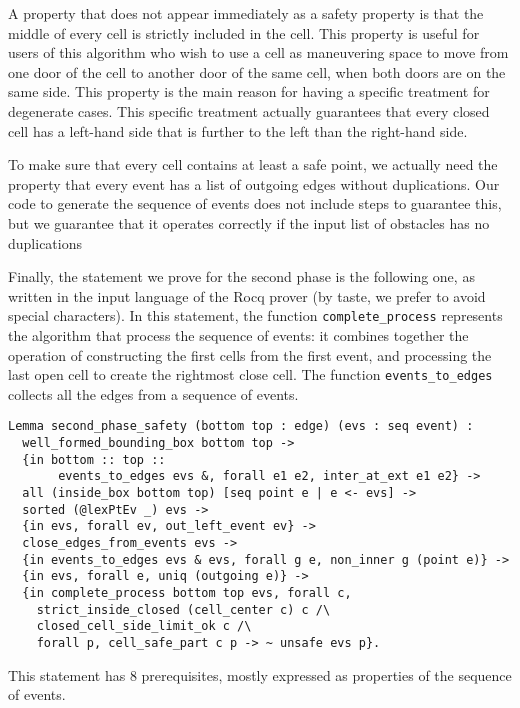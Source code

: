 \documentclass[a4paper, USenglish, cleveref, autoref, thm-restate]{lipics-v2021}
\begin{document}
A property that does not appear immediately as a safety property is
that the middle of every cell is strictly included in the cell.  This
property is useful for users of this algorithm who wish to use a cell
as maneuvering space to move from one door of the cell to another door of
the same cell, when both doors are on the same side.  This property is
the main reason for having a specific treatment for degenerate cases.
This specific treatment actually guarantees that every closed cell has
a left-hand side that is further to the left than the
right-hand side.

To make sure that every cell contains at least a safe point, we
actually need the property that every event has a list of outgoing
edges without duplications.  Our code to generate the sequence of
events does not include steps to guarantee this, but we guarantee
that it operates correctly if the input
list of obstacles has no duplications

Finally, the statement we prove for the second phase is the following one,
as written in the input language of the Rocq prover (by taste, we prefer
to avoid special characters).  In this statement, the function
{\tt complete\_process} represents the algorithm that process the sequence of
events: it combines together the operation of constructing the first cells
from the first event, and processing the last open cell to create the rightmost
close cell.  The function {\tt events\_to\_edges} collects all the edges
from a sequence of events.
\begin{verbatim}
Lemma second_phase_safety (bottom top : edge) (evs : seq event) :
  well_formed_bounding_box bottom top ->
  {in bottom :: top ::
       events_to_edges evs &, forall e1 e2, inter_at_ext e1 e2} ->
  all (inside_box bottom top) [seq point e | e <- evs] ->
  sorted (@lexPtEv _) evs ->
  {in evs, forall ev, out_left_event ev} ->
  close_edges_from_events evs ->
  {in events_to_edges evs & evs, forall g e, non_inner g (point e)} ->
  {in evs, forall e, uniq (outgoing e)} ->
  {in complete_process bottom top evs, forall c,
    strict_inside_closed (cell_center c) c /\
    closed_cell_side_limit_ok c /\
    forall p, cell_safe_part c p -> ~ unsafe evs p}.
\end{verbatim}
This statement has 8 prerequisites, mostly expressed as properties of the
sequence of events.
\end{document}
